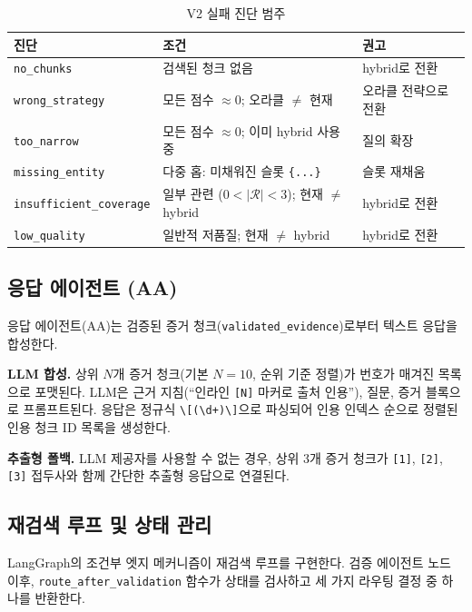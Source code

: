 \begin{table}[H]
\centering
\caption{V2 실패 진단 범주}
\label{tab:v2_failure_ko}
\begin{tabular}{lll}
\toprule
\textbf{진단} & \textbf{조건} & \textbf{권고} \\
\midrule
\texttt{no\_chunks}             & 검색된 청크 없음 & hybrid로 전환 \\
\texttt{wrong\_strategy}        & 모든 점수 $\approx 0$; 오라클 $\neq$ 현재 & 오라클 전략으로 전환 \\
\texttt{too\_narrow}            & 모든 점수 $\approx 0$; 이미 hybrid 사용 중 & 질의 확장 \\
\texttt{missing\_entity}        & 다중 홉: 미채워진 슬롯 \texttt{\{...\}} & 슬롯 재채움 \\
\texttt{insufficient\_coverage} & 일부 관련 ($0 < |\mathcal{R}| < 3$); 현재 $\neq$ hybrid & hybrid로 전환 \\
\texttt{low\_quality}           & 일반적 저품질; 현재 $\neq$ hybrid & hybrid로 전환 \\
\bottomrule
\end{tabular}
\end{table}

\subsection{응답 에이전트 (AA)}
\label{subsec:v2_answer_ko}

응답 에이전트(AA)는 검증된 증거 청크(\texttt{validated\_evidence})로부터 텍스트 응답을 합성한다.

\textbf{LLM 합성.} 상위 $N$개 증거 청크(기본 $N = 10$, 순위 기준 정렬)가 번호가 매겨진 목록으로 포맷된다. LLM은 근거 지침(``인라인 \texttt{[N]} 마커로 출처 인용''), 질문, 증거 블록으로 프롬프트된다. 응답은 정규식 \texttt{\textbackslash[(\textbackslash d+)\textbackslash]}으로 파싱되어 인용 인덱스 순으로 정렬된 인용 청크 ID 목록을 생성한다.

\textbf{추출형 폴백.} LLM 제공자를 사용할 수 없는 경우, 상위 3개 증거 청크가 \texttt{[1]}, \texttt{[2]}, \texttt{[3]} 접두사와 함께 간단한 추출형 응답으로 연결된다.

\subsection{재검색 루프 및 상태 관리}
\label{subsec:v2_loop_ko}

LangGraph의 조건부 엣지 메커니즘이 재검색 루프를 구현한다. 검증 에이전트 노드 이후, \texttt{route\_after\_validation} 함수가 상태를 검사하고 세 가지 라우팅 결정 중 하나를 반환한다.

